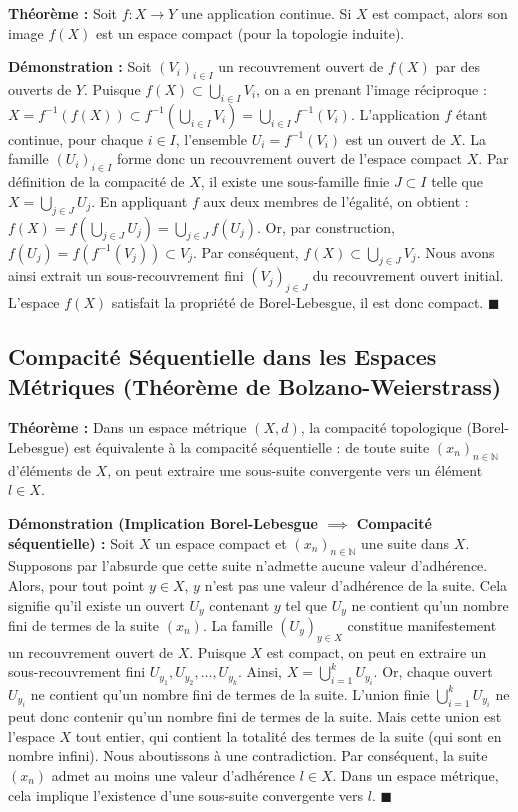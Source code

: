 \documentclass[11pt,a4paper]{article}
\begin{document}
\textbf{Théorème :} Soit $f : X \to Y$ une application continue. Si $X$ est compact, alors son image $f(X)$ est un espace compact (pour la topologie induite).

\textbf{Démonstration :}
Soit $(V_i)_{i \in I}$ un recouvrement ouvert de $f(X)$ par des ouverts de $Y$.
Puisque $f(X) \subset \bigcup_{i \in I} V_i$, on a en prenant l'image réciproque :
$X = f^{-1}(f(X)) \subset f^{-1}\left( \bigcup_{i \in I} V_i \right) = \bigcup_{i \in I} f^{-1}(V_i)$.
L'application $f$ étant continue, pour chaque $i \in I$, l'ensemble $U_i = f^{-1}(V_i)$ est un ouvert de $X$.
La famille $(U_i)_{i \in I}$ forme donc un recouvrement ouvert de l'espace compact $X$.
Par définition de la compacité de $X$, il existe une sous-famille finie $J \subset I$ telle que $X = \bigcup_{j \in J} U_j$.
En appliquant $f$ aux deux membres de l'égalité, on obtient :
$f(X) = f\left( \bigcup_{j \in J} U_j \right) = \bigcup_{j \in J} f(U_j)$.
Or, par construction, $f(U_j) = f(f^{-1}(V_j)) \subset V_j$.
Par conséquent, $f(X) \subset \bigcup_{j \in J} V_j$.
Nous avons ainsi extrait un sous-recouvrement fini $(V_j)_{j \in J}$ du recouvrement ouvert initial. L'espace $f(X)$ satisfait la propriété de Borel-Lebesgue, il est donc compact. $\blacksquare$

\subsection{Compacité Séquentielle dans les Espaces Métriques (Théorème de Bolzano-Weierstrass)}

\textbf{Théorème :} Dans un espace métrique $(X, d)$, la compacité topologique (Borel-Lebesgue) est équivalente à la compacité séquentielle : de toute suite $(x_n)_{n \in \mathbb{N}}$ d'éléments de $X$, on peut extraire une sous-suite convergente vers un élément $l \in X$.

\textbf{Démonstration (Implication Borel-Lebesgue $\implies$ Compacité séquentielle) :}
Soit $X$ un espace compact et $(x_n)_{n \in \mathbb{N}}$ une suite dans $X$. Supposons par l'absurde que cette suite n'admette aucune valeur d'adhérence.
Alors, pour tout point $y \in X$, $y$ n'est pas une valeur d'adhérence de la suite. Cela signifie qu'il existe un ouvert $U_y$ contenant $y$ tel que $U_y$ ne contient qu'un nombre fini de termes de la suite $(x_n)$.
La famille $(U_y)_{y \in X}$ constitue manifestement un recouvrement ouvert de $X$.
Puisque $X$ est compact, on peut en extraire un sous-recouvrement fini $U_{y_1}, U_{y_2}, \dots, U_{y_k}$.
Ainsi, $X = \bigcup_{i=1}^k U_{y_i}$.
Or, chaque ouvert $U_{y_i}$ ne contient qu'un nombre fini de termes de la suite. L'union finie $\bigcup_{i=1}^k U_{y_i}$ ne peut donc contenir qu'un nombre fini de termes de la suite.
Mais cette union est l'espace $X$ tout entier, qui contient la totalité des termes de la suite (qui sont en nombre infini). Nous aboutissons à une contradiction.
Par conséquent, la suite $(x_n)$ admet au moins une valeur d'adhérence $l \in X$. Dans un espace métrique, cela implique l'existence d'une sous-suite convergente vers $l$. $\blacksquare$
\end{document}

